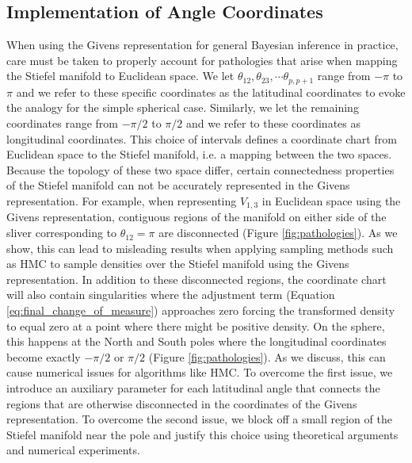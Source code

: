 \documentclass[ba]{imsart}
\numberwithin{equation}{section}
\theoremstyle{plain}
\begin{document}
\subsection{Implementation of Angle Coordinates}
When using the Givens representation for general Bayesian inference in practice, care must be taken to properly account for pathologies that arise when mapping the Stiefel manifold to Euclidean space. We let $\theta_{12}, \theta_{23}, \cdots \theta_{p,p+1}$ range from $-\pi$ to $\pi$ and we refer to these specific coordinates as the latitudinal coordinates to evoke the analogy for the simple spherical case. Similarly, we let the remaining coordinates range from $-\pi/2$ to $\pi/2$ and we refer to these coordinates as longitudinal coordinates. This choice of intervals defines a coordinate chart from Euclidean space to the Stiefel manifold, i.e. a mapping between the two spaces. Because the topology of these two space differ, certain connectedness properties of the Stiefel manifold can not be accurately represented in the Givens representation. For example, when representing $V_{1,3}$ in Euclidean space using the Givens representation, contiguous regions of the manifold on either side of the sliver corresponding to $\theta_{12} = \pi$ are disconnected (Figure \ref{fig:pathologies}). As we show, this can lead to misleading results when applying sampling methods such as HMC to sample densities over the Stiefel manifold using the Givens representation. In addition to these disconnected regions, the coordinate chart will also contain singularities where the adjustment term (Equation \ref{eq:final_change_of_measure}) approaches zero forcing the transformed density to equal zero at a point where there might be positive density. On the sphere, this happens at the North and South poles where the longitudinal coordinates become exactly $-\pi/2$ or $\pi/2$ (Figure \ref{fig:pathologies}). As we discuss, this can cause numerical issues for algorithms like HMC. To overcome the first issue, we introduce an auxiliary parameter for each latitudinal angle that connects the regions that are otherwise disconnected in the coordinates of the Givens representation. To overcome the second issue, we block off a small region of the Stiefel manifold near the pole and justify this choice using theoretical arguments and numerical experiments.
\end{document}
